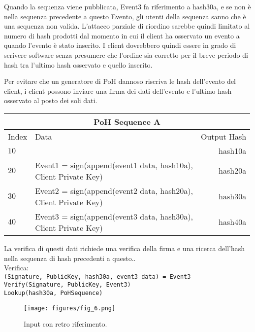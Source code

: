\documentclass[12pt]{article}
\begin{document}
Quando la sequenza viene pubblicata, Event3 fa riferimento a hash30a, e se non è nella sequenza precedente a questo Evento, gli utenti della sequenza sanno che è una sequenza non valida. L'attacco parziale di riordino sarebbe quindi limitato al numero di hash prodotti dal momento in cui il client ha osservato un evento a quando l'evento è stato inserito. I client dovrebbero quindi essere in grado di scrivere software senza presumere che l'ordine sia corretto per il breve periodo di hash tra l'ultimo hash osservato e quello inserito.

Per evitare che un generatore di PoH dannoso riscriva le hash dell'evento del client, i client possono inviare una firma dei dati dell'evento e l'ultimo hash osservato al posto dei soli dati.\\
\begin{center}
  \begin{tabular}{  l  l  r }
    \multicolumn{3}{c}{PoH Sequence A} \\
    \hline
    Index & Data & Output Hash \\ \hline
    $10$ & & hash10a  \\
    $20$ & \makecell{Event1 = sign(append(event1 data, hash10a), \\Client Private Key)} & hash20a\\
    $30$ & \makecell{Event2 = sign(append(event2 data, hash20a), \\Client Private Key)} & hash30a \\
    $40$ & \makecell{Event3 = sign(append(event3 data, hash30a), \\Client Private Key)} & hash40a \\

    \end{tabular}
\end{center}

La verifica di questi dati richiede una verifica della firma e una ricerca dell'hash nella sequenza di hash precedenti a questo..\\
\noindent Verifica:\\

\noindent\texttt{(Signature, PublicKey, hash30a, event3 data) = Event3} \\
\texttt{Verify(Signature, PublicKey, Event3)} \\
\texttt{Lookup(hash30a, PoHSequence)} \\

\begin{figure}
  \begin{center}
    \centering
    \texttt{[image: figures/fig\_6.png]}
    \caption[Fig 6]{Input con retro riferimento.\label{fig:poh_consistency}}
  \end{center}
  \end{figure}
\end{document}

